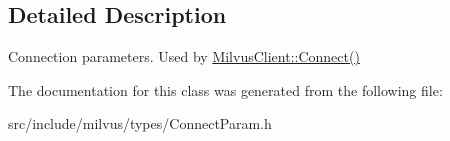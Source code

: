 \subsection{Detailed Description}
Connection parameters. Used by \hyperlink{classmilvus_1_1_milvus_client_a617f8dbeb20e2bd3da0736f38927d2bb}{Milvus\+Client\+::\+Connect()} 

The documentation for this class was generated from the following file\+:\begin{DoxyCompactItemize}
\item 
src/include/milvus/types/Connect\+Param.\+h\end{DoxyCompactItemize}
